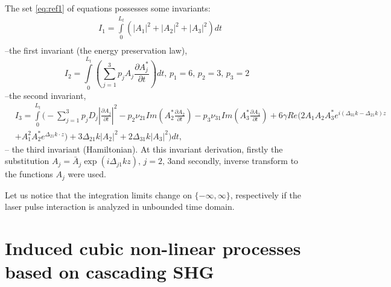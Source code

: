 \documentclass[a4paper, 12pt, onecolumn]{extarticle}
\begin{document}
The set \eqref{eq:ref1} of equations  possesses some invariants:
\begin{equation}
\label{eq:inv1}
\begin{aligned}
&I_1=\int\limits_0^{L_t}\left(|A_1|^2+|A_2|^2+|A_3|^2\right)dt\\
\end{aligned}
\end{equation}
--the first invariant (the energy preservation law),
\begin{equation}
I_2=\int\limits_0^{L_t}\left(\sum\limits_{j=1}^3 p_j A_j \frac{\partial A_j^*}{\partial t}\right)dt,\,p_1=6,\, p_2=3,\, p_3=2
\end{equation}
--the second invariant,
\begin{equation}
\label{eq:inv3}
\begin{aligned}
&I_3=\int\limits_0^{L_t}\Big(-\sum\limits_{j=1}^3 p_jD_j |\frac{\partial A_j}{\partial t}|^2-p_2\nu_{21}Im\left(A_2^*\frac{\partial A_2}{\partial t}\right)-p_3\nu_{31}Im\left(A_3^*\frac{\partial A_3}{\partial t}\right)+6\gamma Re\bigl(2A_1 A_2 A_3^*e^{i(\Delta_{31}k-\Delta_{21}k)z}\\
&+A_1^2 A_2^*e^{\Delta_{21}k\cdot z}\bigr)+3\Delta_{21} k|A_2|^2+2\Delta_{31} k|A_3|^2\Big)dt,
\end{aligned}
\end{equation}
-- the third invariant (Hamiltonian). At this invariant derivation, firstly the substitution $A_j=\bar{A}_j\exp(i\Delta_{j1}kz),\,j=2,\,3$and secondly, inverse transform to the functions $A_j$ were used.

Let us notice that  the integration limits change on \(\{-\infty,\infty\}\), respectively if the laser pulse interaction is analyzed in unbounded time domain. 

\section*{Induced cubic non-linear processes based on cascading SHG}
\end{document}
